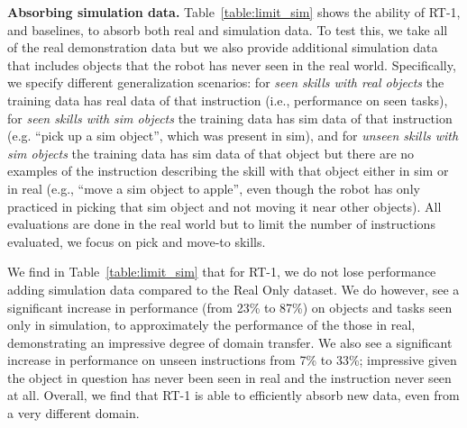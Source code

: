 \documentclass{article} %
\newcommand{\algname}{RT-1\xspace}
\begin{document}
\textbf{Absorbing simulation data.}
Table~\ref{table:limit_sim} shows the ability of \algname, and baselines, to absorb both real and simulation data. 
To test this, we take all of the real demonstration data but we also provide additional simulation data that includes objects that the robot has never seen in the real world. 
Specifically, we specify different generalization scenarios: for \textit{seen skills with real objects} the training data has real data of that instruction (i.e., performance on seen tasks),
for \textit{seen skills with sim objects} the training data has sim data of that instruction (e.g. ``pick up a sim object'', which was present in sim), and for \textit{unseen skills with sim objects} the training data has sim data of that object but there are no examples of the instruction describing the skill with that object either in sim or in real (e.g., ``move a sim object to apple'', even though the robot has only practiced in picking that sim object and not moving it near other objects).
All evaluations are done in the real world but to limit the number of instructions evaluated, we focus on pick and move-to skills.

We find in Table~\ref{table:limit_sim} that for \algname, we do not lose performance adding simulation data compared to the Real Only dataset. 
We do however, see a significant increase in performance (from 23\% to 87\%) on objects and tasks seen only in simulation, to approximately the performance of the those in real, demonstrating an impressive degree of domain transfer.
We also see a significant increase in performance on unseen instructions from 7\%
to 33\%; impressive given the object in question has never been seen in real and the instruction never seen at all.
Overall, we find that \algname is able to efficiently absorb new data, even from a very different domain.
\end{document}
